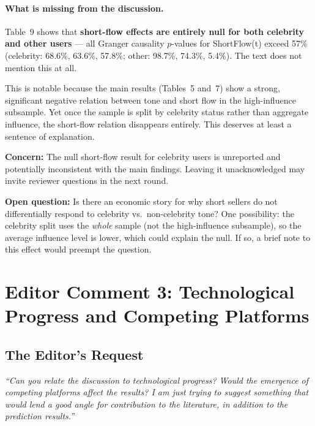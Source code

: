 \documentclass[11pt]{article}
\newcommand{\concern}[1]{\textcolor{concern}{\textbf{Concern:} #1}}
\newcommand{\question}[1]{\textcolor{question}{\textbf{Open question:} #1}}
\begin{document}
\paragraph{What is missing from the discussion.}
Table~9 shows that \textbf{short-flow effects are entirely null for both
celebrity and other users} --- all Granger causality $p$-values for
ShortFlow(t) exceed 57\% (celebrity: 68.6\%, 63.6\%, 57.8\%; other:
98.7\%, 74.3\%, 5.4\%). The text does not mention this at all.

This is notable because the main results (Tables~5 and~7) show a strong,
significant negative relation between tone and short flow in the
high-influence subsample. Yet once the sample is split by celebrity status
rather than aggregate influence, the short-flow relation disappears
entirely. This deserves at least a sentence of explanation.

\concern{The null short-flow result for celebrity users is unreported and
potentially inconsistent with the main findings. Leaving it unacknowledged
may invite reviewer questions in the next round.}

\question{Is there an economic story for why short sellers do not
differentially respond to celebrity vs.\ non-celebrity tone? One
possibility: the celebrity split uses the \textit{whole} sample (not the
high-influence subsample), so the average influence level is lower, which
could explain the null. If so, a brief note to this effect would preempt
the question.}

\newpage
\section{Editor Comment 3: Technological Progress and Competing Platforms}

\subsection*{The Editor's Request}
\begin{mdframed}
\textit{``Can you relate the discussion to technological progress? Would
the emergence of competing platforms affect the results? I am just trying
to suggest something that would lend a good angle for contribution to the
literature, in addition to the prediction results.''}
\end{mdframed}
\end{document}
